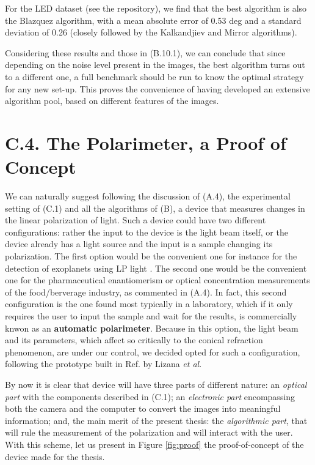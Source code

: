 \documentclass[11pt, a4paper, twoside]{article} %
\begin{document}
For the LED dataset (see the repository), we find that the best algorithm is also the Blazquez algorithm, with a mean absolute error of 0.53 deg and a standard deviation of 0.26 (closely followed by the Kalkandjiev and Mirror algorithms).\vspace{-0.06cm}

Considering these results and those in (B.10.1), we can conclude that since depending on the noise level present in the images, the best algorithm turns out to a different one, a full benchmark should be run to know the optimal strategy for any new set-up. This proves the convenience of having developed an extensive algorithm pool, based on different features of the images.
\newpage

\section*{C.4. The Polarimeter, a Proof of Concept\vspace{-0.1cm}} 
We can naturally suggest following the discussion of (A.4), the experimental setting of (C.1) and all the algorithms of (B), a device that measures changes in the linear polarization of light. Such a device could have two different configurations: rather the input to the device is the light beam itself, or the device already has a light source and the input is a sample changing its polarization. The first option would be the convenient one for instance for the detection of exoplanets using LP light \cite{exoplanets, exoplanets2}. The second one would be the convenient one for the pharmaceutical enantiomerism or optical concentration measurements of the food/berverage industry, as commented in (A.4). In fact, this second configuration is the one found most typically in a laboratory, which if it only requires the user to input the sample and wait for the results, is commercially knwon as an {\bf automatic polarimeter}. Because in this option, the light beam and its parameters, which affect so critically to the conical refraction phenomenon, are under our control, we decided opted for such a configuration, following the prototype built in Ref. \cite{incomplete} by Lizana {\em et al}.

By now it is clear that device will have three parts of different nature: an {\em optical part} with the components described in (C.1); an {\em electronic part} encompassing both the camera and the computer to convert the images into meaningful information; and, the main merit of the present thesis: the {\em algorithmic part}, that will rule the measurement of the polarization and will interact with the user. With this scheme, let us present in Figure \ref{fig:proof} the proof-of-concept of the device made for the thesis.
\end{document}
